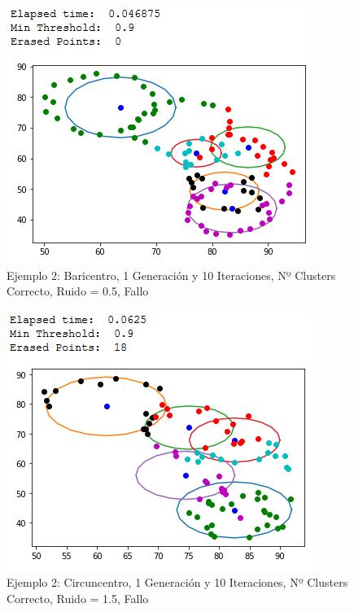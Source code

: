 \documentclass[conference,a4paper]{IEEEtran}
\begin{document}
\begin{figure}[H]
\centering
\includegraphics[scale=0.65]{Experimentacion/Ejemplo2/ej2_b_1_10_lr_wrong}
\caption{Ejemplo 2: Baricentro, 1 Generación y 10 Iteraciones,  Nº Clusters Correcto, Ruido = 0.5, Fallo\\}
\end{figure}

\begin{figure}[H]
\centering
\includegraphics[scale=0.65]{Experimentacion/Ejemplo2/ej2_c_1_10_mr_wrong}
\caption{Ejemplo 2: Circuncentro, 1 Generación y 10 Iteraciones,  Nº Clusters Correcto, Ruido = 1.5, Fallo\\}
\end{figure}
\end{document}
